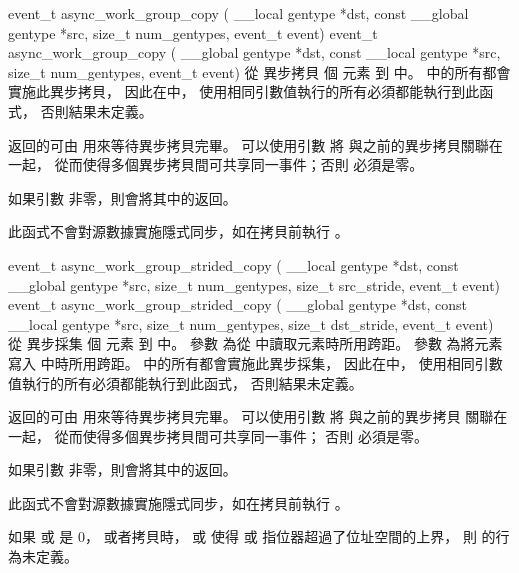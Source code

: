event_t async_work_group_copy ( 
	__local gentype *dst, 
	const __global gentype *src, 
	size_t num_gentypes, 
	event_t event) 
event_t async_work_group_copy (
	__global gentype *dst,
	const __local gentype *src,
	size_t num_gentypes,
	event_t event)
\stopbuffer
{}
從  異步拷貝  個  元素
到  中。
中的所有都會實施此異步拷貝，
因此在中，
使用相同引數值執行的所有必須都能執行到此函式，
否則結果未定義。

返回的可由  用來等待異步拷貝完畢。
可以使用引數  將  與之前的異步拷貝關聯在一起，
從而使得多個異步拷貝間可共享同一事件；否則  必須是零。

如果引數  非零，則會將其中的返回。

此函式不會對源數據實施隱式同步，如在拷貝前執行 。
\stopbuffer

event_t async_work_group_strided_copy (
	__local gentype *dst,
	const __global gentype *src,
	size_t num_gentypes,
	size_t src_stride,
	event_t event)
event_t async_work_group_strided_copy (
	__global gentype *dst,
	const __local gentype *src,
	size_t num_gentypes,
	size_t dst_stride,
	event_t event)
\stopbuffer
{}
從  異步採集  個  元素
到  中。
參數  為從  中讀取元素時所用跨距。
參數  為將元素寫入  中時所用跨距。
中的所有都會實施此異步採集，
因此在中，
使用相同引數值執行的所有必須都能執行到此函式，
否則結果未定義。

返回的可由  用來等待異步拷貝完畢。
可以使用引數  將  與之前的異步拷貝
關聯在一起，
從而使得多個異步拷貝間可共享同一事件；
否則  必須是零。

如果引數  非零，則會將其中的返回。

此函式不會對源數據實施隱式同步，如在拷貝前執行 。

如果  或  是 0，
或者拷貝時，  或  使得
  或  指位器超過了位址空間的上界，
則  的行為未定義。
\stopbuffer

